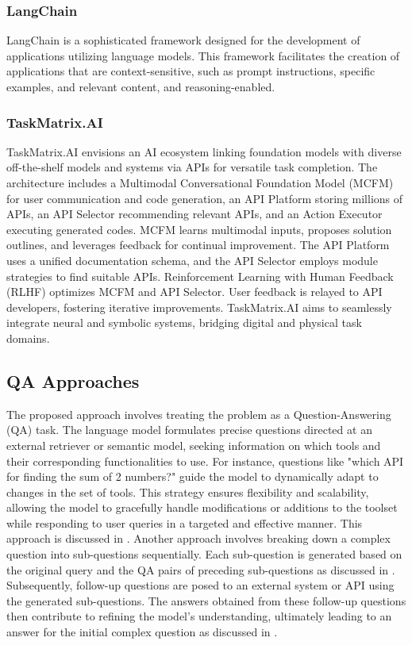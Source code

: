 \documentclass[10pt,twocolumn,letterpaper]{article}
\begin{document}
\subsubsection{LangChain \cite{langchainIntroduction}} LangChain is a sophisticated framework designed for the development of applications utilizing language models. This framework facilitates the creation of applications that are context-sensitive, such as prompt instructions, specific examples, and relevant content, and reasoning-enabled.
\subsubsection{TaskMatrix.AI \cite{liang2023taskmatrixai}}
TaskMatrix.AI envisions an AI ecosystem linking foundation models with diverse off-the-shelf models and systems via APIs for versatile task completion. The architecture includes a Multimodal Conversational Foundation Model (MCFM) for user communication and code generation, an API Platform storing millions of APIs, an API Selector recommending relevant APIs, and an Action Executor executing generated codes. MCFM learns multimodal inputs, proposes solution outlines, and leverages feedback for continual improvement. The API Platform uses a unified documentation schema, and the API Selector employs module strategies to find suitable APIs. Reinforcement Learning with Human Feedback (RLHF) optimizes MCFM and API Selector. User feedback is relayed to API developers, fostering iterative improvements. TaskMatrix.AI aims to seamlessly integrate neural and symbolic systems, bridging digital and physical task domains.
\subsection{QA Approaches}
The proposed approach involves treating the problem as a Question-Answering (QA) task. The language model formulates precise questions directed at an external retriever or semantic model, seeking information on which tools and their corresponding functionalities to use. For instance, questions like "which API for finding the sum of 2 numbers?" guide the model to dynamically adapt to changes in the set of tools. This strategy ensures flexibility and scalability, allowing the model to gracefully handle modifications or additions to the toolset while responding to user queries in a targeted and effective manner. This approach is discussed in \cite{wolfson2020break}. Another approach involves breaking down a complex question into sub-questions sequentially. Each sub-question is generated based on the original query and the QA pairs of preceding sub-questions as discussed in \cite{zhou2023leasttomost} . Subsequently, follow-up questions are posed to an external system or API using the generated sub-questions. The answers obtained from these follow-up questions then contribute to refining the model's understanding, ultimately leading to an answer for the initial complex question as discussed in \cite{press2023measuring}.
\end{document}
